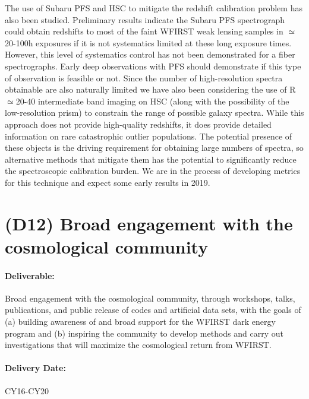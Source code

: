 The use of Subaru PFS and HSC to mitigate the redshift calibration problem has
also been studied.  Preliminary results indicate the Subaru PFS spectrograph
could obtain redshifts to most of the faint WFIRST weak lensing samples in
$\simeq$20-100h exposures if it is not systematics limited at these long
exposure times.  However, this level of systematics control has not been
demonstrated for a fiber spectrographs.  Early deep observations with PFS should
demonstrate if this type of observation is feasible or not.  Since the number of
high-resolution spectra obtainable are also naturally limited we have also been
considering the use of R$\simeq$20-40 intermediate band imaging on HSC (along with the
possibility of the low-resolution prism) to constrain the range of possible
galaxy spectra.  While this approach does not provide high-quality redshifts, it
does provide detailed information on rare catastrophic outlier populations.  The
potential presence of these objects is the driving requirement for obtaining
large numbers of spectra, so alternative methods that mitigate them has the
potential to significantly reduce the spectroscopic calibration burden.  We are
in the process of developing metrics for this technique and expect some early
results in 2019.

\section*{(D12) Broad engagement with the cosmological community}

\paragraph*{Deliverable:} Broad engagement with the cosmological community, through
workshops, talks, publications, and public release of codes and artificial data
sets, with the goals of (a) building awareness of and broad support for the
WFIRST dark energy program and (b) inspiring the community to develop methods
and carry out investigations that will maximize the cosmological return from
WFIRST.

\paragraph*{Delivery Date:} CY16-CY20


